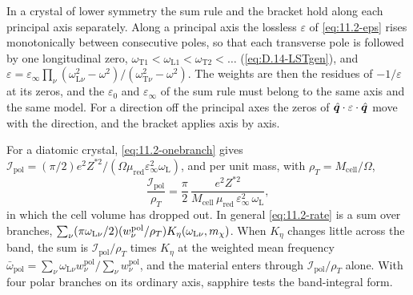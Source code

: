 In a crystal of lower symmetry the sum rule and the bracket hold along each principal axis separately. Along a principal axis the lossless $\varepsilon$ of \cref{eq:11.2-eps} rises monotonically between consecutive poles, so that each transverse pole is followed by one longitudinal zero, $\omega_{\mathrm{T}1} < \omega_{\mathrm{L}1} < \omega_{\mathrm{T}2} < \dots$ (\cref{eq:D.14-LSTgen}), and $\varepsilon = \varepsilon_\infty\prod_\nu(\omega_{\mathrm{L}\nu}^2 - \omega^2)/(\omega_{\mathrm{T}\nu}^2 - \omega^2)$. The weights are then the residues of $-1/\varepsilon$ at its zeros, and the $\varepsilon_0$ and $\varepsilon_\infty$ of the sum rule must belong to the same axis and the same model. For a direction off the principal axes the zeros of $\hat{\bm{q}}\cdot\varepsilon\cdot\hat{\bm{q}}$ move with the direction, and the bracket applies axis by axis.

For a diatomic crystal, \cref{eq:11.2-onebranch} gives $\mathcal{I}_{\mathrm{pol}} = (\pi/2)e^2Z^{*2}/(\Omega\mu_{\mathrm{red}}\varepsilon_\infty^2\omega_{\mathrm{L}})$, and per unit mass, with $\rho_T = M_{\mathrm{cell}}/\Omega$,
\begin{equation}
  \frac{\mathcal{I}_{\mathrm{pol}}}{\rho_T} = \frac{\pi}{2}\,\frac{e^2Z^{*2}}{M_{\mathrm{cell}}\,\mu_{\mathrm{red}}\,\varepsilon_\infty^2\,\omega_{\mathrm{L}}} ,
  \label{eq:11.2-diatomic}
\end{equation}
in which the cell volume has dropped out. In general \cref{eq:11.2-rate} is a sum over branches, $\sum_\nu(\pi\omega_{\mathrm{L}\nu}/2)(w^{\mathrm{pol}}_\nu/\rho_T)K_\eta(\omega_{\mathrm{L}\nu},m_{\chi})$. When $K_\eta$ changes little across the band, the sum is $\mathcal{I}_{\mathrm{pol}}/\rho_T$ times $K_\eta$ at the weighted mean frequency $\bar\omega_{\mathrm{pol}} = \sum_\nu\omega_{\mathrm{L}\nu}w^{\mathrm{pol}}_\nu/\sum_\nu w^{\mathrm{pol}}_\nu$, and the material enters through $\mathcal{I}_{\mathrm{pol}}/\rho_T$ alone. With four polar branches on its ordinary axis, sapphire tests the band-integral form.

